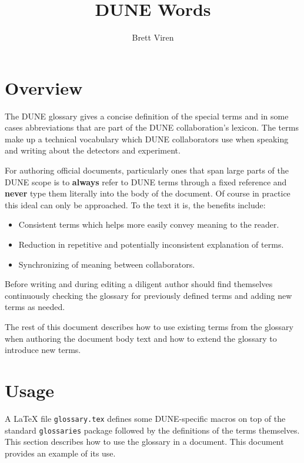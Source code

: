 \documentclass{article}
\title{DUNE Words}
\author{Brett Viren}
\begin{document}
\maketitle
\tableofcontents

\section{Overview}

The DUNE glossary gives a concise definition of the special terms and
in some cases abbreviations that are part of the DUNE collaboration's
lexicon.
The terms make up a technical vocabulary which DUNE collaborators
use when speaking and writing about the detectors and experiment.

For authoring official documents, particularly ones that span large
parts of the DUNE scope is to \textbf{always} refer to DUNE terms
through a fixed reference and \textbf{never} type them literally into
the body of the document. 
Of course in practice this ideal can only be approached. 
To the text it is, the benefits include:

\begin{itemize}
\item Consistent terms which helps more easily convey meaning to the reader.
\item Reduction in repetitive and potentially inconsistent explanation
  of terms.  
\item Synchronizing of meaning between collaborators.
\end{itemize}

Before writing and during editing a diligent author should find
themselves continuously checking the glossary for previously defined
terms and adding new terms as needed.

The rest of this document describes how to use existing terms from the
glossary when authoring the document body text and how to extend the
glossary to introduce new terms.


\section{Usage}

A \LaTeX{} file \texttt{glossary.tex} defines some DUNE-specific
macros on top of the standard \texttt{glossaries} package followed by
the definitions of the terms themselves. 
This section describes how to use the glossary in a document. 
This document provides an example of its use.
\end{document}
